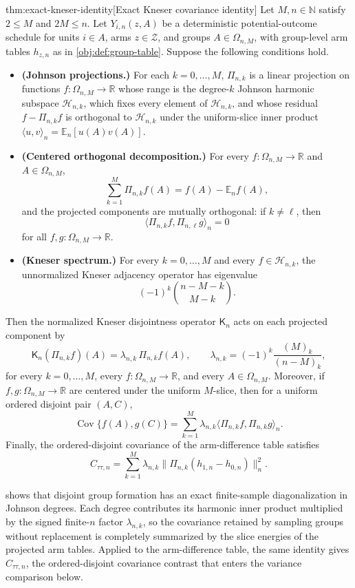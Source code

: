 \begin{theoremv}{thm:exact-kneser-identity}[Exact Kneser covariance identity]
Let \(M,n\in\mathbb N\) satisfy \(2\le M\) and \(2M\le n\). Let \(Y_{i,n}(z,A)\) be a deterministic potential-outcome schedule for units \(i\in A\), arms \(z\in\mathcal Z\), and groups \(A\in\Omega_{n,M}\), with group-level arm tables \(h_{z,n}\) as in \cref{obj:def:group-table}. Suppose the following conditions hold.
\begin{itemize}
\item \textbf{(Johnson projections.)} For each \(k=0,\ldots,M\), \(\Pi_{n,k}\) is a linear projection on functions \(f:\Omega_{n,M}\to\mathbb R\) whose range is the degree-\(k\) Johnson harmonic subspace \(\mathcal H_{n,k}\), which fixes every element of \(\mathcal H_{n,k}\), and whose residual \(f-\Pi_{n,k}f\) is orthogonal to \(\mathcal H_{n,k}\) under the uniform-slice inner product \(\langle u,v\rangle_n=\mathbb E_n[u(A)v(A)]\).
\item \textbf{(Centered orthogonal decomposition.)} For every \(f:\Omega_{n,M}\to\mathbb R\) and \(A\in\Omega_{n,M}\),
\[
\sum_{k=1}^{M}\Pi_{n,k}f(A)=f(A)-\mathbb E_n f(A),
\]
and the projected components are mutually orthogonal: if \(k\ne \ell\), then
\[
\langle \Pi_{n,k}f,\Pi_{n,\ell}g\rangle_n=0
\]
for all \(f,g:\Omega_{n,M}\to\mathbb R\).
\item \textbf{(Kneser spectrum.)} For every \(k=0,\ldots,M\) and every \(f\in\mathcal H_{n,k}\), the unnormalized Kneser adjacency operator has eigenvalue
\[
(-1)^k {n-M-k\choose M-k}.
\]
\end{itemize}
Then the normalized Kneser disjointness operator \(\mathsf K_n\) acts on each projected component by
\[
\mathsf K_n(\Pi_{n,k}f)(A)=\lambda_{n,k}\,\Pi_{n,k}f(A),
\qquad
\lambda_{n,k}=(-1)^k\frac{(M)_k}{(n-M)_k},
\]
for every \(k=0,\ldots,M\), every \(f:\Omega_{n,M}\to\mathbb R\), and every \(A\in\Omega_{n,M}\). Moreover, if \(f,g:\Omega_{n,M}\to\mathbb R\) are centered under the uniform \(M\)-slice, then for a uniform ordered disjoint pair \((A,C)\),
\[
\operatorname{Cov}\{f(A),g(C)\}
=
\sum_{k=1}^{M}\lambda_{n,k}
\langle \Pi_{n,k}f,\Pi_{n,k}g\rangle_n .
\]
Finally, the ordered-disjoint covariance of the arm-difference table satisfies
\[
C_{\tau\tau,n}
=
\sum_{k=1}^{M}\lambda_{n,k}
\bigl\|\Pi_{n,k}(h_{1,n}-h_{0,n})\bigr\|_n^2 .
\]
\end{theoremv}

 shows that disjoint group formation has an exact finite-sample diagonalization in Johnson degrees. Each degree contributes its harmonic inner product multiplied by the signed finite-\(n\) factor \(\lambda_{n,k}\), so the covariance retained by sampling groups without replacement is completely summarized by the slice energies of the projected arm tables. Applied to the arm-difference table, the same identity gives \(C_{\tau\tau,n}\), the ordered-disjoint covariance contrast that enters the variance comparison below.

